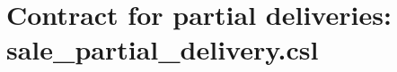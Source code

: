 \documentclass[10pt,a4paper,final,oneside,openany,article]{memoir}
\begin{document}
\printbibliography


\newpage
    \appendix
\chapter{Contract for partial deliveries: sale\_partial\_delivery.csl}
\label{chap:sale_partial_delivery}

\end{document}
